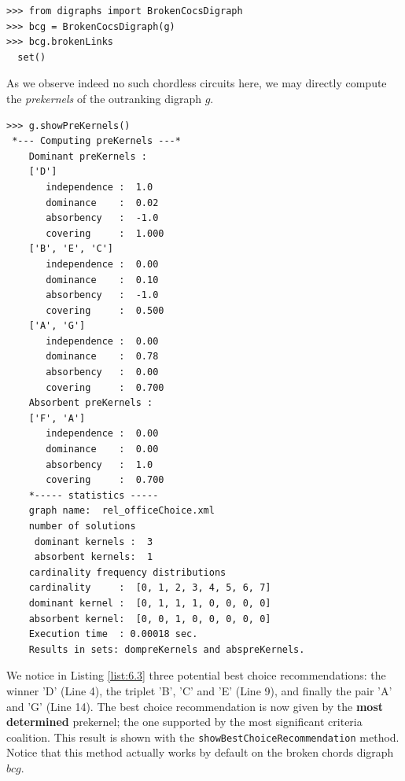 \begin{lstlisting}
>>> from digraphs import BrokenCocsDigraph
>>> bcg = BrokenCocsDigraph(g)
>>> bcg.brokenLinks
  set()
\end{lstlisting}

As we observe indeed no such chordless circuits here, we may directly compute the \emph{prekernels} of the outranking digraph $g$.

\begin{lstlisting}[caption={Computing outranking and outranked prekernels},label=list:6.3]
>>> g.showPreKernels()
 *--- Computing preKernels ---*
    Dominant preKernels :
    ['D']
       independence :  1.0
       dominance    :  0.02
       absorbency   :  -1.0
       covering     :  1.000
    ['B', 'E', 'C']
       independence :  0.00
       dominance    :  0.10
       absorbency   :  -1.0
       covering     :  0.500
    ['A', 'G']
       independence :  0.00
       dominance    :  0.78
       absorbency   :  0.00
       covering     :  0.700
    Absorbent preKernels :
    ['F', 'A']
       independence :  0.00
       dominance    :  0.00
       absorbency   :  1.0
       covering     :  0.700
    *----- statistics -----
    graph name:  rel_officeChoice.xml
    number of solutions
     dominant kernels :  3
     absorbent kernels:  1
    cardinality frequency distributions
    cardinality     :  [0, 1, 2, 3, 4, 5, 6, 7]
    dominant kernel :  [0, 1, 1, 1, 0, 0, 0, 0]
    absorbent kernel:  [0, 0, 1, 0, 0, 0, 0, 0]
    Execution time  : 0.00018 sec.
    Results in sets: dompreKernels and abspreKernels.
\end{lstlisting}
  
We notice in Listing \ref{list:6.3} three potential best choice recommendations: the \Condorcet winner 'D' (Line 4), the triplet 'B', 'C' and 'E' (Line 9), and finally the pair 'A' and 'G' (Line 14). The best choice recommendation is now given by the \textbf{most determined} prekernel; the one supported by the most significant criteria coalition. This result is shown with the \texttt{showBestChoiceRecommendation} method. Notice that this method actually works by default on the broken chords digraph $bcg$.

